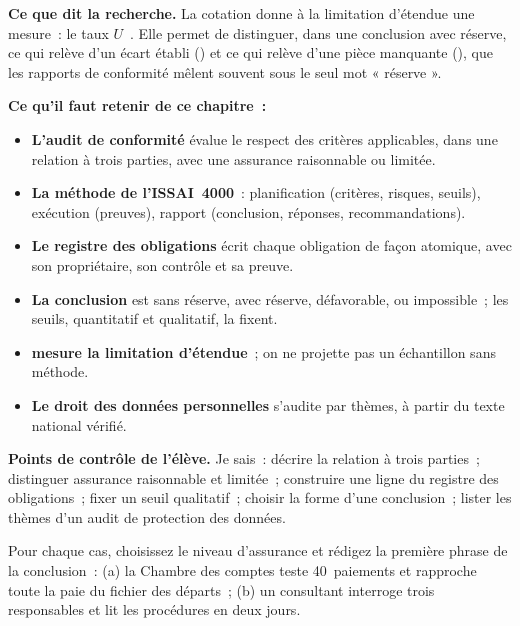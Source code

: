 \begin{boxinfo}
\textbf{Ce que dit la recherche.} La cotation \NEK{} donne à la limitation
d'étendue une mesure~: le taux $U$~\cite{minka2026nek}. Elle permet de
distinguer, dans une conclusion avec réserve, ce qui relève d'un écart
établi (\NON{}) et ce qui relève d'une pièce manquante (\NEK{}), que les
rapports de conformité mêlent souvent sous le seul mot « réserve ».
\end{boxinfo}

\separateur

\begin{boxresume}
\textbf{Ce qu'il faut retenir de ce chapitre~:}
\begin{itemize}
    \item \textbf{L'audit de conformité} évalue le respect des critères
          applicables, dans une relation à trois parties, avec une assurance
          raisonnable ou limitée.
    \item \textbf{La méthode de l'ISSAI~4000}~: planification (critères,
          risques, seuils), exécution (preuves), rapport (conclusion,
          réponses, recommandations).
    \item \textbf{Le registre des obligations} écrit chaque obligation de
          façon atomique, avec son propriétaire, son contrôle et sa preuve.
    \item \textbf{La conclusion} est sans réserve, avec réserve,
          défavorable, ou impossible~; les seuils, quantitatif et
          qualitatif, la fixent.
    \item \textbf{\NEK{} mesure la limitation d'étendue}~; on ne projette
          pas un échantillon sans méthode.
    \item \textbf{Le droit des données personnelles} s'audite par thèmes, à
          partir du texte national vérifié.
\end{itemize}
\end{boxresume}

\begin{boxinfo}
\textbf{Points de contrôle de l'élève.} Je sais~: décrire la relation à
trois parties~; distinguer assurance raisonnable et limitée~; construire
une ligne du registre des obligations~; fixer un seuil qualitatif~;
choisir la forme d'une conclusion~; lister les thèmes d'un audit de
protection des données.
\end{boxinfo}

\bigskip

\begin{boxexo}[title={\ding{45}\quad Exercice~25.1. Raisonnable ou limitée~? \niveaubase}]
Pour chaque cas, choisissez le niveau d'assurance et rédigez la première
phrase de la conclusion~: (a) la Chambre des comptes teste 40~paiements et
rapproche toute la paie du fichier des départs~; (b) un consultant
interroge trois responsables et lit les procédures en deux jours.
\end{boxexo}

